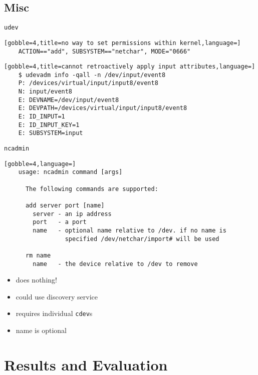 \documentclass[handout]{beamer}
\begin{document}
\subsection{Misc}

\begin{frame}[t,fragile]{\texttt{udev}}
  \begin{lstlisting}[gobble=4,title=no way to set permissions within kernel,language=]
    ACTION=="add", SUBSYSTEM=="netchar", MODE="0666"
  \end{lstlisting}
  \begin{lstlisting}[gobble=4,title=cannot retroactively apply input attributes,language=]
    $ udevadm info -qall -n /dev/input/event8
    P: /devices/virtual/input/input8/event8
    N: input/event8
    E: DEVNAME=/dev/input/event8
    E: DEVPATH=/devices/virtual/input/input8/event8
    E: ID_INPUT=1
    E: ID_INPUT_KEY=1
    E: SUBSYSTEM=input
  \end{lstlisting}
\end{frame}

\begin{frame}[fragile]{\texttt{ncadmin}}
  \begin{lstlisting}[gobble=4,language=]
    usage: ncadmin command [args]

      The following commands are supported:

      add server port [name]
        server - an ip address
        port   - a port
        name   - optional name relative to /dev. if no name is
                 specified /dev/netchar/import# will be used

      rm name
        name   - the device relative to /dev to remove
  \end{lstlisting}
  \begin{itemize}
    \item<2-> does nothing!
    \item<3-> could use discovery service
    \item<4-> requires individual \texttt{cdev}s
    \item<5-> name is optional
  \end{itemize}
\end{frame}



\section{Results and Evaluation}
\end{document}
